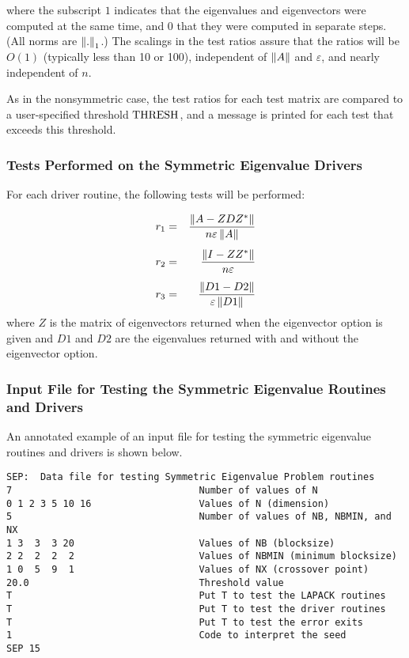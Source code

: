 where the subscript $1$ indicates that the eigenvalues and eigenvectors
were computed at the same time,
and $0$ that they were computed in separate steps.
(All norms are $\left\|{.}\right\|_1$.)
The scalings in the test ratios assure that the ratios will be $O(1)$
(typically less than 10 or 100),
independent of $\left\| A\right\|$ and $\varepsilon$,
and nearly independent of $n$.

As in the nonsymmetric case, the test ratios for each test
matrix are compared to a user-specified threshold ${\rm THRESH}$,
and a message is printed for each test that exceeds this threshold.

\subsubsection{Tests Performed on the Symmetric Eigenvalue Drivers}

\dent
For each driver routine, the following tests will be performed:

\begin{eqnarray}
          r_1&=&\frac{\left\| A - Z D Z^* \right\|}
                {n \varepsilon \left\| A \right\|} \nonumber\\[1ex] 
          r_2&=&\frac{\left\| I - Z Z^* \right\|}
                {n \varepsilon } \nonumber\\[1ex]
          r_3&=&\frac{\left\| D1 - D2 \right\|}
                {\varepsilon \left\| D1 \right\|} \nonumber
\end{eqnarray}
where $Z$ is the matrix of eigenvectors returned when the
eigenvector option is given and $D1$ and $D2$ are the eigenvalues
returned with and without the eigenvector option.

\subsubsection{Input File for Testing the Symmetric Eigenvalue Routines
and Drivers}

\dent
An annotated example of an input file for testing the symmetric
eigenvalue routines and drivers is shown below.

\begin{verbatim}
SEP:  Data file for testing Symmetric Eigenvalue Problem routines
7                                 Number of values of N
0 1 2 3 5 10 16                   Values of N (dimension)
5                                 Number of values of NB, NBMIN, and NX
1 3  3  3 20                      Values of NB (blocksize)
2 2  2  2  2                      Values of NBMIN (minimum blocksize)
1 0  5  9  1                      Values of NX (crossover point)
20.0                              Threshold value
T                                 Put T to test the LAPACK routines
T                                 Put T to test the driver routines
T                                 Put T to test the error exits
1                                 Code to interpret the seed
SEP 15
\end{verbatim}

